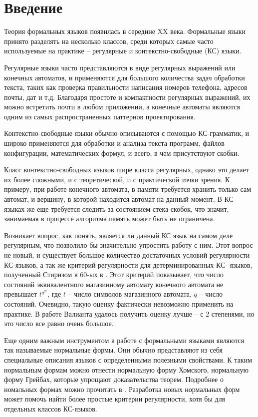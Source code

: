 \chapter{Введение} \label{chapter0}


Теория формальных языков появилась в середине XX века. 
Формальные языки принято разделять на несколько классов, среди которых самые часто используемые на практике -- 
регулярные и контекстно-свободные (КС) языки. 

Регулярные языки часто представляются в виде регулярных выражений или
конечных автоматов, и применяются для большого количества задач обработки текста, 
таких как проверка правильности написания номеров телефона, адресов почты, дат и т.д.
Благодаря простоте и компактности регулярных выражений, их можно встретить почти в любом
приложении, а конечные автоматы являются одним из самых распространенных паттернов проектирования.

Контекстно-свободные языки обычно описываются с помощью КС-грамматик,
и широко применяются для обработки и анализа текста программ, файлов конфигурации, математических
формул, и всего, в чем присутствуют скобки.

Класс контекстно-свободных языков шире класса регулярных, однако это делает их более сложными,
и с теоретической, и с практической точки зрения. К примеру, при работе конечного автомата,
в памяти требуется хранить только сам автомат, и вершину, в которой находится автомат на данный 
момент. В КС-языках же еще требуется следить за состоянием стека скобок,
что значит, занимаемая в процессе алгоритма память может быть не ограничена. 

Возникает вопрос, как понять, является ли данный КС язык на самом деле регулярным, что позволило бы
значительно упростить работу с ним. Этот вопрос не новый, и существует большое количество
достаточных условий регулярности КС-языков, а так же критерий регулярности для детерминированных КС-
языков, полученный Стирнзом в 60-ых в \cite{STEARNS1967323}. Этот критерий показывает, что число состояний эквивалентного
магазинному автомату конечного автомата не превышает $t^{q^{q^{q}}}$,
где $t$ -- число символов магазинного автомата, $q$ -- число состояний.
Очевидно, такую оценку фактически невозможно применить на практике.
В работе Валианта \cite{Valiant1975RegularityAR} удалось получить оценку лучше -- с 2 степенями, 
но это число все равно очень большое. 

Еще одним важным инструментом в работе с формальными языками являются так называемые нормальные формы.
Они обычно представляют из себя специальные описания языков с определенными полезными свойствами.
К таким нормальным формам можно отнести нормальную форму Хомского, нормальную форму Грейбах,
которые упрощают доказательства теорем. Подробнее о номальных формах можно прочитать в \cite{handbook_of_formal}.
Разработка новых нормальных форм может помочь найти более простые критерии регулярности, хотя бы для
отдельных классов КС-языков.

